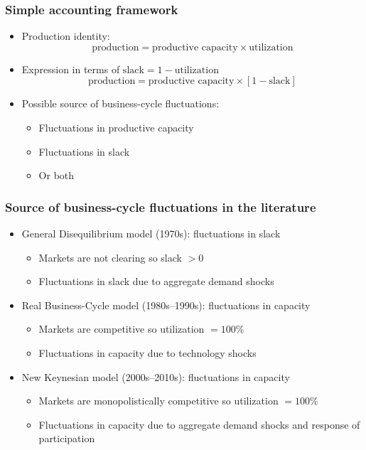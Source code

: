 \documentclass[11pt,aspectratio=169,xcolor={dvipsnames},hyperref={pdftex,pdfpagemode=UseNone,hidelinks,pdfdisplaydoctitle=true},usepdftitle=false]{beamer}
\begin{document}
\begin{frame}
\end{frame}

\begin{frame}
\frametitle{Simple accounting framework}
\begin{itemize}	
\item Production identity:
\begin{equation*}
\text{production} = \text{productive capacity} \times \text{utilization}
\end{equation*}
\item Expression in terms of $\text{slack} = 1 - \text{utilization}$
\begin{equation*}
\text{production} = \text{productive capacity} \times [1 - \text{slack}]
\end{equation*}
\item Possible source of business-cycle fluctuations:
\begin{itemize}
	\item Fluctuations in productive capacity
	\item Fluctuations in slack
	\item Or both
\end{itemize}
\end{itemize}	
\end{frame}

\begin{frame}
\frametitle{Source of business-cycle fluctuations in the literature}
\begin{itemize}
\item General Disequilibrium model (1970s): fluctuations in slack
\begin{itemize}
	\item Markets are not clearing so slack $> 0$
	\item Fluctuations in slack due to aggregate demand shocks
\end{itemize}
\item Real Business-Cycle model (1980s–1990s): fluctuations in capacity
\begin{itemize}
	\item Markets are competitive so utilization $= 100\%$
	\item Fluctuations in capacity due to technology shocks
\end{itemize}
\item New Keynesian model (2000s–2010s): fluctuations in capacity
\begin{itemize}
	\item Markets are monopolistically competitive so utilization $= 100\%$
	\item Fluctuations in capacity due to aggregate demand shocks and response of participation
\end{itemize}
\end{itemize}
\end{frame}
\end{document}
